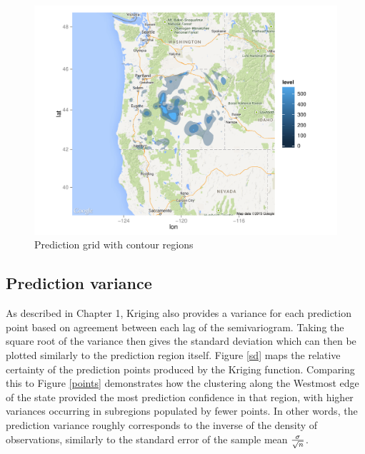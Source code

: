 \documentclass[12pt,twoside]{reedthesis}
\begin{document}
\begin{figure}[h]
	   
	       \centering
	  
	    \includegraphics[scale=0.9]{polygon_plot}
	
	     \caption{Prediction grid with contour regions}
	 \label{polygon}
	\end{figure}
	
	   
	  
	
	
\subsection{Prediction variance}

As described in Chapter 1, Kriging also provides a variance for each prediction point based on agreement between each lag of the semivariogram. Taking the square root of the variance then gives the standard deviation which can then be plotted similarly to the prediction region itself. Figure \ref{sd} maps the relative certainty of the prediction points produced by the Kriging function. Comparing this to Figure \ref{points} demonstrates how the clustering along the Westmost edge of the state provided the most prediction confidence in that region, with higher variances occurring in subregions populated by fewer points. In other words, the prediction variance roughly corresponds to the inverse of the density of observations, similarly to the standard error of the sample mean ${\sigma}\over{\sqrt{n}}$.
	
\end{document}
